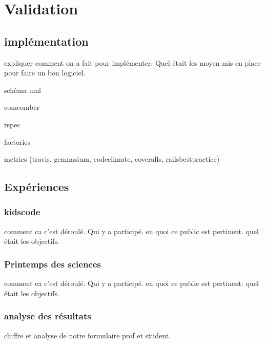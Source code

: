 \chapter{Validation}
\section{implémentation}
expliquer comment on a fait pour implémenter. Quel était les moyen mis en place pour faire un bon logiciel.

schéma uml

comcomber

rspec

factories

metrics (travis, gemnasium, codeclimate, coveralls, railsbestpractice)

\section{Expériences}
\subsection{kidscode}
comment ca c'est déroulé. Qui y a participé. en quoi ce public est pertinent. quel était les objectifs.

\subsection{Printemps des sciences}
comment ca c'est déroulé. Qui y a participé. en quoi ce public est pertinent. quel était les objectifs.

\subsection{analyse des résultats}
chiffre et analyse de notre formulaire prof et student.
